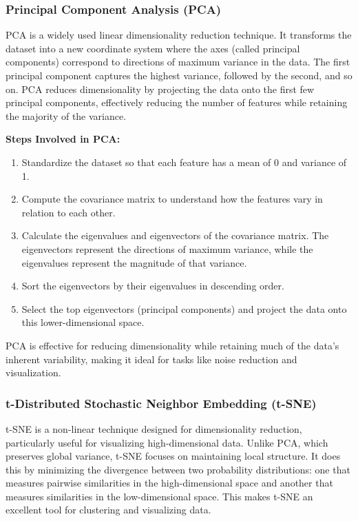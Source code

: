 \documentclass{article}
\begin{document}
\subsubsection{Principal Component Analysis (PCA)}
PCA is a widely used linear dimensionality reduction technique. It transforms the dataset into a new coordinate system where the axes (called principal components) correspond to directions of maximum variance in the data. The first principal component captures the highest variance, followed by the second, and so on. PCA reduces dimensionality by projecting the data onto the first few principal components, effectively reducing the number of features while retaining the majority of the variance.

\textbf{Steps Involved in PCA:}
\begin{enumerate}
    \item Standardize the dataset so that each feature has a mean of 0 and variance of 1.
    \item Compute the covariance matrix to understand how the features vary in relation to each other.
    \item Calculate the eigenvalues and eigenvectors of the covariance matrix. The eigenvectors represent the directions of maximum variance, while the eigenvalues represent the magnitude of that variance.
    \item Sort the eigenvectors by their eigenvalues in descending order.
    \item Select the top eigenvectors (principal components) and project the data onto this lower-dimensional space.
\end{enumerate}

PCA is effective for reducing dimensionality while retaining much of the data's inherent variability, making it ideal for tasks like noise reduction and visualization.

\subsubsection{t-Distributed Stochastic Neighbor Embedding (t-SNE)}
t-SNE is a non-linear technique designed for dimensionality reduction, particularly useful for visualizing high-dimensional data. Unlike PCA, which preserves global variance, t-SNE focuses on maintaining local structure. It does this by minimizing the divergence between two probability distributions: one that measures pairwise similarities in the high-dimensional space and another that measures similarities in the low-dimensional space. This makes t-SNE an excellent tool for clustering and visualizing data.
\end{document}
